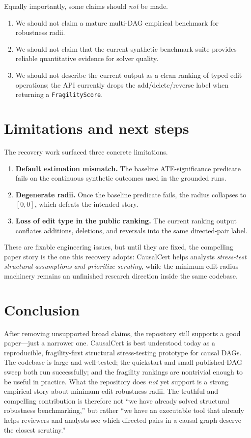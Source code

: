 \documentclass[11pt]{article}
\begin{document}
Equally importantly, some claims should \emph{not} be made.
\begin{enumerate}[leftmargin=*]
    \item We should not claim a mature multi-DAG empirical benchmark for robustness radii.
    \item We should not claim that the current synthetic benchmark suite provides reliable quantitative evidence for solver quality.
    \item We should not describe the current output as a clean ranking of typed edit operations; the API currently drops the add/delete/reverse label when returning a \texttt{FragilityScore}.
\end{enumerate}

\section{Limitations and next steps}

The recovery work surfaced three concrete limitations.
\begin{enumerate}[leftmargin=*]
    \item \textbf{Default estimation mismatch.} The baseline ATE-significance predicate fails on the continuous synthetic outcomes used in the grounded runs.
    \item \textbf{Degenerate radii.} Once the baseline predicate fails, the radius collapses to $[0,0]$, which defeats the intended story.
    \item \textbf{Loss of edit type in the public ranking.} The current ranking output conflates additions, deletions, and reversals into the same directed-pair label.
\end{enumerate}

These are fixable engineering issues, but until they are fixed, the compelling paper story is the one this recovery adopts: CausalCert helps analysts \emph{stress-test structural assumptions and prioritize scrutiny}, while the minimum-edit radius machinery remains an unfinished research direction inside the same codebase.

\section{Conclusion}

After removing unsupported broad claims, the repository still supports a good paper---just a narrower one. CausalCert is best understood today as a reproducible, fragility-first structural stress-testing prototype for causal DAGs. The codebase is large and well-tested; the quickstart and small published-DAG sweep both run successfully; and the fragility rankings are nontrivial enough to be useful in practice. What the repository does \emph{not} yet support is a strong empirical story about minimum-edit robustness radii. The truthful and compelling contribution is therefore not ``we have already solved structural robustness benchmarking,'' but rather ``we have an executable tool that already helps reviewers and analysts see which directed pairs in a causal graph deserve the closest scrutiny.''
\end{document}
